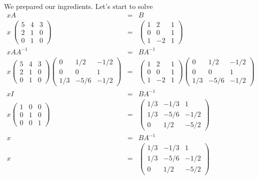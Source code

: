 \documentclass[11pt]{article}
\begin{document}
\paragraph{}We prepared our ingredients. Let's start to solve
\begin{eqnarray*}
xA&=&B
\\x\ \begin{pmatrix}
5 & 4 & 3\\
2 & 1 & 0\\
0 & 1 & 0
\end{pmatrix}
&=&
\begin{pmatrix}
1 & 2 & 1\\
0 & 0 & 1\\
1 & -2 & 1
\end{pmatrix}
\\xAA^{-1}&=&BA^{-1}
\\x\begin{pmatrix}
5 & 4 & 3\\
2 & 1 & 0\\
0 & 1 & 0
\end{pmatrix}
\begin{pmatrix}
0 & 1/2 & -1/2\\
0 & 0 & 1\\
1/3 & -5/6 & -1/2
\end{pmatrix}
&=&
\begin{pmatrix}
1 & 2 & 1\\
0 & 0 & 1\\
1 & -2 & 1
\end{pmatrix}
\begin{pmatrix}
0 & 1/2 & -1/2\\
0 & 0 & 1\\
1/3 & -5/6 & -1/2
\end{pmatrix}
\\xI&=&BA^{-1}
\\x
\begin{pmatrix}
1 & 0 & 0\\
0 & 1 & 0\\
0 & 0 & 1
\end{pmatrix}
&=&
\begin{pmatrix}
1/3 & -1/3 & 1\\
1/3 & -5/6 & -1/2\\
0 & 1/2 & -5/2
\end{pmatrix}
\\x&=&BA^{-1}
\\x&=&
\begin{pmatrix}
1/3 & -1/3 & 1\\
1/3 & -5/6 & -1/2\\
0 & 1/2 & -5/2
\end{pmatrix}
\end{eqnarray*}
\end{document}
